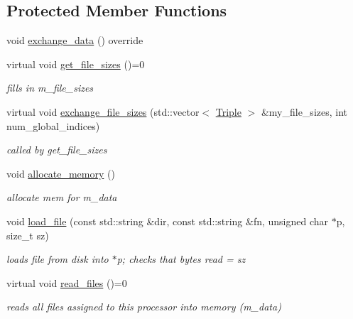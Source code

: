 \subsection*{Protected Member Functions}
\begin{DoxyCompactItemize}
\item 
void \hyperlink{classlbann_1_1data__store__image_a5ff5eccbd469caca692e8259f6f8c021}{exchange\+\_\+data} () override
\item 
virtual void \hyperlink{classlbann_1_1data__store__image_a8694bc9157c5fdc80bb5c251e68e18cb}{get\+\_\+file\+\_\+sizes} ()=0
\begin{DoxyCompactList}\small\item\em fills in m\+\_\+file\+\_\+sizes \end{DoxyCompactList}\item 
virtual void \hyperlink{classlbann_1_1data__store__image_a477529f2ba3f86598bbd409d3c2b6901}{exchange\+\_\+file\+\_\+sizes} (std\+::vector$<$ \hyperlink{structlbann_1_1data__store__image_1_1Triple}{Triple} $>$ \&my\+\_\+file\+\_\+sizes, int num\+\_\+global\+\_\+indices)
\begin{DoxyCompactList}\small\item\em called by get\+\_\+file\+\_\+sizes \end{DoxyCompactList}\item 
void \hyperlink{classlbann_1_1data__store__image_af74877e493b5a822dd3d3793a95ceb9d}{allocate\+\_\+memory} ()
\begin{DoxyCompactList}\small\item\em allocate mem for m\+\_\+data \end{DoxyCompactList}\item 
void \hyperlink{classlbann_1_1data__store__image_a8a53bab58d75554821f90c38d14078aa}{load\+\_\+file} (const std\+::string \&dir, const std\+::string \&fn, unsigned char $\ast$p, size\+\_\+t sz)
\begin{DoxyCompactList}\small\item\em loads file from disk into $\ast$p; checks that bytes read = sz \end{DoxyCompactList}\item 
virtual void \hyperlink{classlbann_1_1data__store__image_a146874a68c24213f5509efb9727cb6e5}{read\+\_\+files} ()=0
\begin{DoxyCompactList}\small\item\em reads all files assigned to this processor into memory (m\+\_\+data) \end{DoxyCompactList}\end{DoxyCompactItemize}
